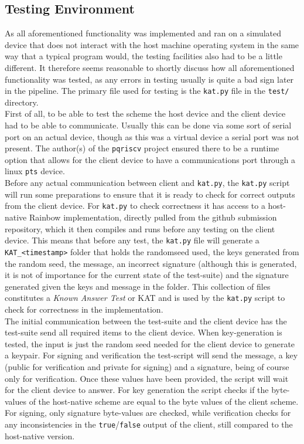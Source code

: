 \subsection{Testing Environment}
As all aforementioned functionality was implemented and ran on a simulated device that does not interact with the host machine operating system in the same way that a typical program would, the testing facilities also had to be a little different. It therefore seems reasonable to shortly discuss how all aforementioned functionality was tested, as any errors in testing usually is quite a bad sign later in the pipeline. The primary file used for testing is the \texttt{kat.py} file in the \texttt{test/} directory.\medskip\\
First of all, to be able to test the scheme the host device and the client device had to be able to communicate. Usually this can be done via some sort of serial port on an actual device, though as this was a virtual device a serial port was not present. The author(s) of the \texttt{pqriscv} project ensured there to be a runtime option that allows for the client device to have a communications port through a linux \texttt{pts} device.\medskip\\
Before any actual communication between client and \texttt{kat.py}, the \texttt{kat.py} script will run some preparations to ensure that it is ready to check for correct outputs from the client device. For \texttt{kat.py} to check correctness it has access to a host-native Rainbow implementation, directly pulled from the github submission repository, which it then compiles and runs before any testing on the client device. This means that before any test, the \texttt{kat.py} file will generate a \texttt{KAT\_<timestamp>} folder that holds the randomseed used, the keys generated from the random seed, the message, an incorrect signature (although this is generated, it is not of importance for the current state of the test-suite) and the signature generated given the keys and message in the folder. This collection of files constitutes a \textit{Known Answer Test} or KAT and is used by the \texttt{kat.py} script to check for correctness in the implementation.\medskip\\
The initial communication between the test-suite and the client device has the test-suite send all required items to the client device. When key-generation is tested, the input is just the random seed needed for the client device to generate a keypair. For signing and verification the test-script will send the message, a key (public for verification and private for signing) and a signature, being of course only for verification. Once these values have been provided, the script will wait for the client device to answer. For key generation the script checks if the byte-values of the host-native scheme are equal to the byte values of the client scheme. For signing, only signature byte-values are checked, while verification checks for any inconsistencies in the \texttt{true}/\texttt{false} output of the client, still compared to the host-native version.
